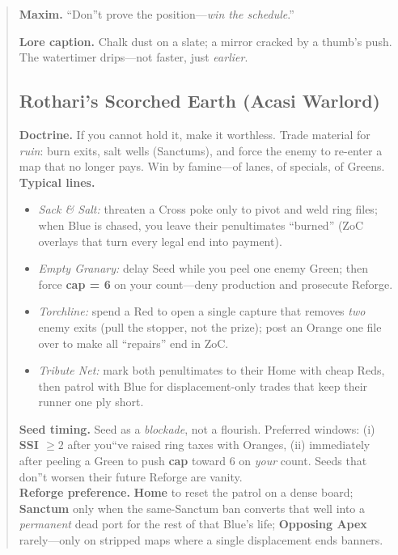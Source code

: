 \documentclass[11pt]{article}
\begin{document}
\begin{quote}
\medskip
\noindent\textbf{Maxim.} ``Don''t prove the position---\emph{win the schedule}.''

\medskip
\noindent\textbf{Lore caption.} Chalk dust on a slate; a mirror cracked by a thumb's push. The watertimer drips---not faster, just \emph{earlier}.
\clearpage
\subsection{Rothari's Scorched Earth (Acasi Warlord)}
\noindent\textbf{Doctrine.} If you cannot hold it, make it worthless. Trade material for \emph{ruin}: burn exits, salt wells (Sanctums), and force the enemy to re-enter a map that no longer pays. Win by famine---of lanes, of specials, of Greens.\\

\noindent\textbf{Typical lines.}
\begin{itemize}\itemsep0.2em
  \item \emph{Sack \& Salt:} threaten a Cross poke only to pivot and weld ring files; when Blue is chased, you leave their penultimates ``burned'' (ZoC overlays that turn every legal end into payment).
  \item \emph{Empty Granary:} delay Seed while you peel one enemy Green; then force \textbf{cap = 6} on your count---deny production and prosecute Reforge.
  \item \emph{Torchline:} spend a Red to open a single capture that removes \emph{two} enemy exits (pull the stopper, not the prize); post an Orange one file over to make all ``repairs'' end in ZoC.
  \item \emph{Tribute Net:} mark both penultimates to their Home with cheap Reds, then patrol with Blue for displacement-only trades that keep their runner one ply short.
\end{itemize}

\noindent\textbf{Seed timing.} Seed as a \emph{blockade}, not a flourish. Preferred windows: (i) \textbf{SSI $\ge 2$} after you``ve raised ring taxes with Oranges, (ii) immediately after peeling a Green to push \textbf{cap} toward $6$ on \emph{your} count. Seeds that don''t worsen their future Reforge are vanity.\\

\noindent\textbf{Reforge preference.} \textbf{Home} to reset the patrol on a dense board; \textbf{Sanctum} only when the same-Sanctum ban converts that well into a \emph{permanent} dead port for the rest of that Blue's life; \textbf{Opposing Apex} rarely---only on stripped maps where a single displacement ends banners.\\


\end{quote}
\end{document}
